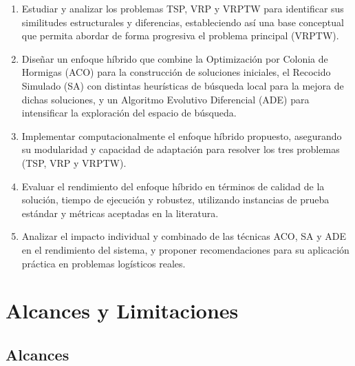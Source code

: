 \documentclass[12pt,titlepage,twoside,openright]{book}
\begin{document}
\begin{enumerate}
	\item Estudiar y analizar los problemas TSP, VRP y VRPTW para identificar sus similitudes estructurales y diferencias, estableciendo así una base conceptual que permita abordar de forma progresiva el problema principal (VRPTW).

	\item Diseñar un enfoque híbrido que combine la Optimización por Colonia de Hormigas (ACO) para la construcción de soluciones iniciales, el Recocido Simulado (SA) con distintas heurísticas de búsqueda local para la mejora de dichas soluciones, y un Algoritmo Evolutivo Diferencial (ADE) para intensificar la exploración del espacio de búsqueda.

	\item Implementar computacionalmente el enfoque híbrido propuesto, asegurando su modularidad y capacidad de adaptación para resolver los tres problemas (TSP, VRP y VRPTW).

	\item Evaluar el rendimiento del enfoque híbrido en términos de calidad de la solución, tiempo de ejecución y robustez, utilizando instancias de prueba estándar y métricas aceptadas en la literatura.

	\item Analizar el impacto individual y combinado de las técnicas ACO, SA y ADE en el rendimiento del sistema, y proponer recomendaciones para su aplicación práctica en problemas logísticos reales.
\end{enumerate}


\section{Alcances y Limitaciones}

\subsection*{Alcances}
\end{document}
